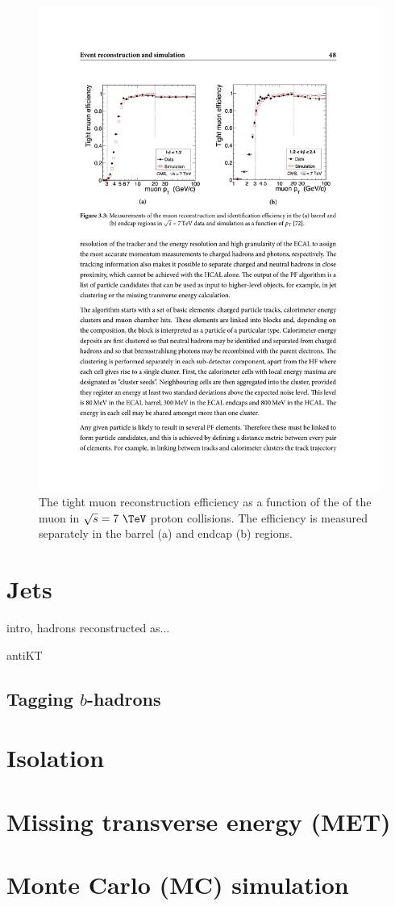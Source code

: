 \begin{figure}
\begin{center}
\includegraphics[width=0.9\linewidth]{figs/reconstruction/muonEff} \end{center}
\caption{ The tight muon reconstruction efficiency as a function of the
\pt of the muon in $\sqrt{s}=7~\tev$ proton collisions. The efficiency
is measured separately in the barrel (a) and endcap (b) regions.
\cite{1748-0221-7-10-P10002}}
\label{fig:muonEff} \end{figure}

\section{Jets}
\label{sec:jets_reco}

intro, hadrons reconstructed as...

antiKT

\subsection{Tagging $b$-hadrons}

\section{Isolation}

\section{Missing transverse energy (MET)}
\label{sec:met_reco}

\section{Monte Carlo (MC) simulation}
\label{sec:mc_reco}

